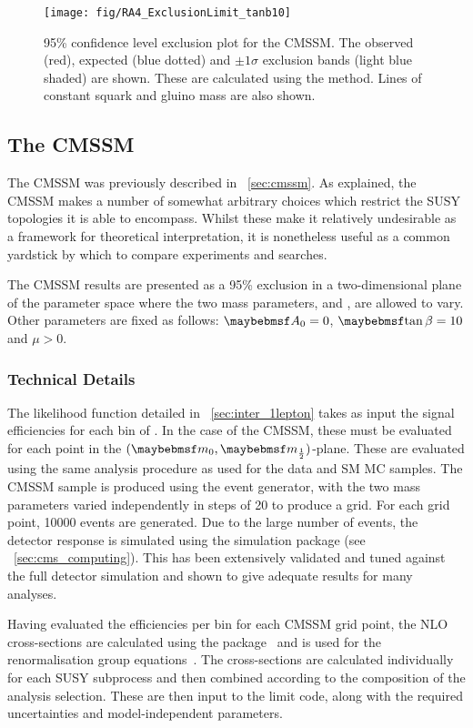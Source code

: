 \begin{figure}
\texttt{[image: fig/RA4\_ExclusionLimit\_tanb10]}
\caption[95\% confidence level exclusion plot for the \acs{CMSSM}]{95\%
  confidence level exclusion plot for the \ac{CMSSM}. The observed (red),
  expected (blue dotted) and $\pm 1\sigma$ exclusion bands (light blue shaded)
  are shown. These are calculated using the \CLs method. Lines of constant
  squark and gluino mass are also shown.}
\label{fig:inter_msugra_exclusion}
\end{figure}

\subsection{The \acs{CMSSM}}
The \ac{CMSSM} was previously described in \sec~\ref{sec:cmssm}. As explained,
the \ac{CMSSM} makes a number of somewhat arbitrary choices which restrict the
\ac{SUSY} topologies it is able to encompass. Whilst these make it relatively
undesirable as a framework for theoretical interpretation, it is nonetheless
useful as a common yardstick by which to compare experiments and searches.

The \ac{CMSSM} results are presented as a 95\% exclusion in a two-dimensional
plane of the parameter space where the two mass parameters, \Mzero and \Mhalf,
are allowed to vary. Other parameters are fixed as follows: $\Azero = 0$,
$\tanbeta = 10$ and $\mu > 0$.

\subsubsection{Technical Details}
The likelihood function detailed in \sec~\ref{sec:inter_1lepton} takes as input
the signal efficiencies for each bin of \STlep. In the case of the \ac{CMSSM},
these must be evaluated for each point in the $(\Mzero, \Mhalf)$-plane. These
are evaluated using the same analysis procedure as used for the data and \ac{SM}
\ac{MC} samples. The \ac{CMSSM} sample is produced using the \pythia event
generator, with the two mass parameters varied independently in steps of
\unit{20}{\GeV} to produce a grid. For each grid point, 10000 events are
generated. Due to the large number of events, the detector response is simulated
using the \fastsim simulation package (see \sec~\ref{sec:cms_computing}). This
has been extensively validated and tuned against the full detector simulation
and shown to give adequate results for many analyses.

Having evaluated the efficiencies per \STlep bin for each \ac{CMSSM}
grid point, the \ac{NLO} cross-sections are calculated using the
\prospino package~\cite{prospino} and \softsusy is used for the
renormalisation group equations~\cite{softsusy}. The cross-sections are calculated
individually for each \ac{SUSY} subprocess and then combined according
to the composition of the analysis selection. These are then input to
the limit code, along with the required uncertainties and
model-independent parameters.

